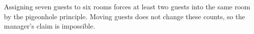 Assigning seven guests to six rooms forces at least two guests into the same room by the pigeonhole principle. Moving guests does not change these counts, so the manager's claim is impossible.

